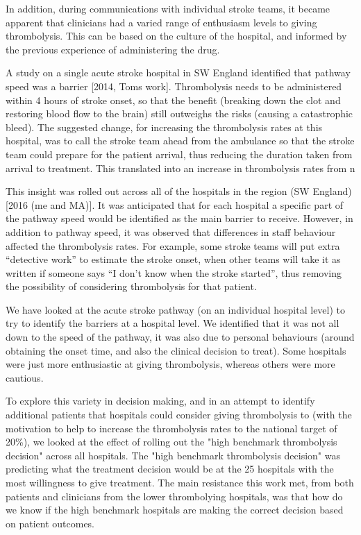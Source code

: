 In addition, during communications with individual stroke teams, it became apparent that clinicians had a varied range of enthusiasm levels to giving thrombolysis. This can be based on the culture of the hospital, and informed by the previous experience of administering the drug.

A study on a single acute stroke hospital in SW England identified that pathway speed was a barrier [2014, Toms work]. Thrombolysis needs to be administered within 4 hours of stroke onset, so that the benefit (breaking down the clot and restoring blood flow to the brain) still outweighs the risks (causing a catastrophic bleed). The suggested change, for increasing the thrombolysis rates at this hospital, was to call the stroke team ahead from the ambulance so that the stroke team could prepare for the patient arrival, thus reducing the duration taken from arrival to treatment. This translated into an increase in thrombolysis rates from n%

This insight was rolled out across all of the hospitals in the region (SW England) [2016 (me and MA)]. It was anticipated that for each hospital a specific part of the pathway speed would be identified as the main barrier to receive. However, in addition to pathway speed, it was observed that differences in staff behaviour affected the thrombolysis rates. For example, some stroke teams will put extra “detective work” to estimate the stroke onset, when other teams will take it as written if someone says “I don’t know when the stroke started”, thus removing the possibility of considering thrombolysis for that patient. 

We have looked at the acute stroke pathway (on an individual hospital level) to try to identify the barriers at a hospital level. We identified that it was not all down to the speed of the pathway, it was also due to personal behaviours (around obtaining the onset time, and also the clinical decision to treat). Some hospitals were just more enthusiastic at giving thrombolysis, whereas others were more cautious.

To explore this variety in decision making, and in an attempt to identify additional patients that hospitals could consider giving thrombolysis to (with the motivation to help to increase the thrombolysis rates to the national target of 20\%), we looked at the effect of rolling out the "high benchmark thrombolysis decision" across all hospitals. The "high benchmark thrombolysis decision" was predicting what the treatment decision would be at the 25 hospitals with the most willingness to give treatment. The main resistance this work met, from both patients and clinicians from the lower thrombolying hospitals, was that how do we know if the high benchmark hospitals are making the correct decision based on patient outcomes.

